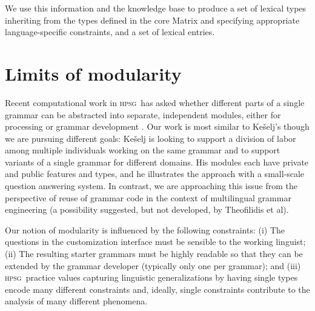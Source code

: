 \documentclass[11pt]{article}
\newcommand{\hpsg}{\textsc{hpsg}}
\begin{document}
We use this information and the knowledge
base to produce a set of lexical types inheriting from the types
defined in the core Matrix and specifying appropriate
language-specific constraints, and a set of lexical entries.



\section{Limits of modularity}

Recent computational work in \hpsg\ has asked whether
different parts of a single grammar can be abstracted
into separate, independent modules, either for processing 
\cite{Kasper:Krieger:96,Theofilidis:etal:97} or grammar
development \cite{Keselj:01}.  Our work is most similar to Ke{\v{s}}elj's
though we are pursuing different goals: Ke{\v{s}}elj\nocite{Keselj:01}
is looking to support a division of labor among multiple
individuals working on the same grammar and to support variants of a
single grammar for different domains.  
His modules each have private and public features and types, and he
illustrates the approach with a small-scale question answering system.
In contrast, we are approaching
this issue from the perspective of reuse of grammar code in the
context of multilingual grammar engineering (a possibility suggested,
but not developed, by Theofilidis et al).

Our notion of modularity is influenced by the following constraints:
(i) The questions in the customization interface must be sensible to
the working linguist; (ii) The resulting starter grammars must be
highly readable so that they can be extended by the grammar developer
(typically only one per grammar); and (iii) \hpsg\ practice values capturing linguistic generalizations by having single
types encode many different constraints and, ideally, single
constraints contribute to the analysis of many different phenomena.
\end{document}
